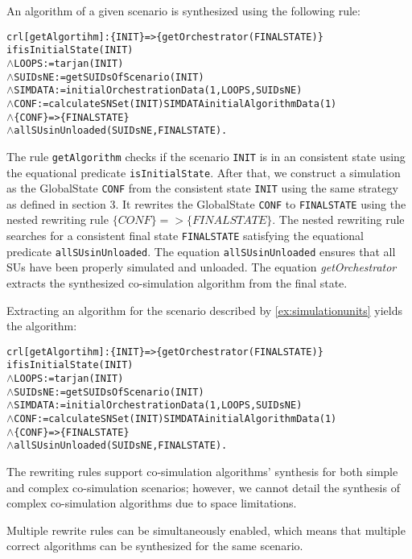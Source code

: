 An algorithm of a given scenario is synthesized using the following rule:
\small
\begin{alltt}
crl [getAlgortihm]: \{ INIT \} => \{ getOrchestrator(FINALSTATE) \}
if isInitialState(INIT)
  \(\land\) LOOPS := tarjan(INIT)
  \(\land\) SUIDsNE := getSUIDsOfScenario(INIT)
  \(\land\) SIMDATA := initialOrchestrationData(1,LOOPS,SUIDsNE)
  \(\land\) CONF := calculateSNSet(INIT) SIMDATA initialAlgorithmData(1)
  \(\land\) \{CONF\} => \{ FINALSTATE\} 
  \(\land\) allSUsinUnloaded(SUIDsNE, FINALSTATE) .
\end{alltt}
\normalfont
The rule \texttt{getAlgorithm} checks if the scenario \texttt{INIT} is in an consistent state using the equational predicate \texttt{isInitialState}.
After that, we construct a simulation as the GlobalState \texttt{CONF} from the consistent state \texttt{INIT} using the same strategy as defined in section 3.
It rewrites the GlobalState \texttt{CONF} to \texttt{FINALSTATE} using the nested rewriting rule $\{CONF\} => \{ FINALSTATE\}$.
The nested rewriting rule searches for a consistent final state \texttt{FINALSTATE} satisfying the equational predicate \texttt{allSUsinUnloaded}.
The equation \texttt{allSUsinUnloaded} ensures that all SUs have been properly simulated and unloaded.
The equation \emph{getOrchestrator} extracts the synthesized co-simulation algorithm from the final state.

\begin{example}
  Extracting an algorithm for the scenario described by \cref{ex:simulationunits} yields the algorithm:
  \small
  \begin{alltt}
  crl [getAlgortihm]: \{ INIT \} => \{ getOrchestrator(FINALSTATE) \}
  if isInitialState(INIT)
    \(\land\) LOOPS := tarjan(INIT)
    \(\land\) SUIDsNE := getSUIDsOfScenario(INIT)
    \(\land\) SIMDATA := initialOrchestrationData(1,LOOPS,SUIDsNE)
    \(\land\) CONF := calculateSNSet(INIT) SIMDATA initialAlgorithmData(1)
    \(\land\) \{CONF\} => \{ FINALSTATE\} 
    \(\land\) allSUsinUnloaded(SUIDsNE, FINALSTATE) .
  \end{alltt}
  \normalfont
\end{example}

The rewriting rules support co-simulation algorithms' synthesis for both simple and complex co-simulation scenarios; however, we cannot detail the synthesis of complex co-simulation algorithms due to space limitations.

Multiple rewrite rules can be simultaneously enabled, which means that multiple correct algorithms can be synthesized for the same scenario.

